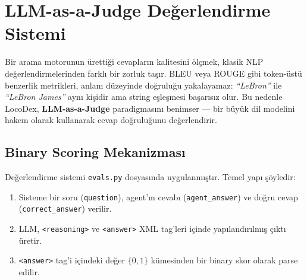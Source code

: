 

\section{LLM-as-a-Judge De\u{g}erlendirme Sistemi}
\label{sec:llm-judge}

Bir arama motorunun \"{u}retti\u{g}i cevaplar{\i}n kalitesini \"{o}l\c{c}mek, klasik NLP de\u{g}erlendirmelerinden farkl{\i} bir zorluk ta\c{s}{\i}r. BLEU veya ROUGE gibi token-\"{u}st\"{u} benzerlik metrikleri, anlam d\"{u}zeyinde do\u{g}rulu\u{g}u yakalayamaz: \emph{``LeBron''} ile \emph{``LeBron James''} ayn{\i} ki\c{s}idir ama string e\c{s}le\c{s}mesi ba\c{s}ar{\i}s{\i}z olur. Bu nedenle LocoDex, \textbf{LLM-as-a-Judge} paradigmas{\i}n{\i} benimser --- bir b\"{u}y\"{u}k dil modelini hakem olarak kullanarak cevap do\u{g}rulu\u{g}unu de\u{g}erlendirir.

\subsection{Binary Scoring Mekanizmas{\i}}

De\u{g}erlendirme sistemi \texttt{evals.py} dosyas{\i}nda uygulanm{\i}\c{s}t{\i}r. Temel yap{\i} \c{s}\"{o}yledir:

\begin{enumerate}
  \item Sisteme bir soru (\texttt{question}), agent'{\i}n cevab{\i} (\texttt{agent\_answer}) ve do\u{g}ru cevap (\texttt{correct\_answer}) verilir.
  \item LLM, \texttt{<reasoning>} ve \texttt{<answer>} XML tag'leri i\c{c}inde yap{\i}land{\i}r{\i}lm{\i}\c{s} \c{c}{\i}kt{\i} \"{u}retir.
  \item \texttt{<answer>} tag'i i\c{c}indeki de\u{g}er $\{0, 1\}$ k\"{u}mesinden bir binary skor olarak parse edilir.
\end{enumerate}

